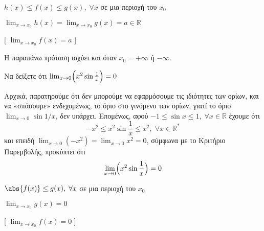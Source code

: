 \begin{prop}[\textcolor{Col1}{Κριτήριο Παρεμβολής}]
\item {}
  \begin{minipage}[t]{8.0 cm}
    \begin{myitemize}
      \item $ h(x) \leq f(x) \leq g(x), \; \forall x$ σε μια περιοχή του $ x_{0} $
        \hfill{}
      \item $ \lim_{x \to x_{0}} h(x) = \lim_{x \to x_{0}} g(x) = a \in \mathbb{R} $
        \hfill{}
    \end{myitemize}
  \end{minipage}
  [ $ \lim_{x \to x_{0}} f(x) = a $ ]
\end{prop}

\begin{rem}
  Η παραπάνω πρόταση ισχύει και όταν $ x_{0} = + \infty $ ή $ - \infty $.
\end{rem}

\begin{example}
  Να δείξετε ότι $ \lim_{x \to 0} \Bigl(x^{2} \sin{\frac{1}{x}}\Bigr) = 0  $ 
\end{example}
\begin{solution}
  Αρχικά, παρατηρούμε ότι δεν μπορούμε να εφαρμόσουμε τις ιδιότητες των ορίων, και να 
  «σπάσουμε» ενδεχομένως, το όριο στο γινόμενο των ορίων, γιατί το όριο 
  $ \lim_{x \to 0} \sin{1/x} $, δεν υπάρχει.
  Επομένως, αφού $ -1 \leq \sin{x} \leq 1, \; \forall x \in \mathbb{R} $ έχουμε ότι
  \[
    - x^{2} \leq x^{2} \sin{\frac{1}{x}} \leq x^{2}, \; \forall x \in \mathbb{R}^{*}
  \]
  και επειδή $ \lim_{x \to 0} (-x^{2}) = \lim_{x \to 0} x^{2} = 0 $, σύμφωνα με το 
  Κριτήριο Παρεμβολής, προκύπτει ότι 
  \[
    \lim_{x \to 0} \Bigl(x^{2} \sin{\frac{1}{x}}\Bigr)  = 0
  \]
\end{solution}

\begin{cor}
\item {}
  \begin{minipage}[t]{7.0 cm}
    \begin{myitemize}
      \item $ \abs{f(x)} \leq g(x), \; \forall x $ σε μια περιοχή του $ x_{0} $
        \hfill{}
      \item $ \lim_{x \to x_{0}} g(x) = 0 $
        \hfill{}
    \end{myitemize}
  \end{minipage}
  [ $ \lim_{x \to x_{0}} f(x) = 0 $ ]
\end{cor}

